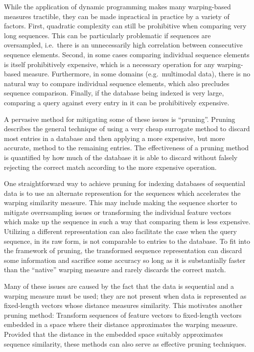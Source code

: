 While the application of dynamic programming makes many warping-based measures tractible, they can be made inpractical in practice by a variety of factors.
First, quadratic complexity can still be prohibitive when comparing very long sequences.
This can be particularly problematic if sequences are oversampled, i.e.\ there is an unnecessarily high correlation between consecutive sequence elements.
Second, in some cases comparing individual sequence elements is itself prohibitively expensive, which is a necessary operation for any warping-based measure.
Furthermore, in some domains (e.g.\ multimodal data), there is no natural way to compare individual sequence elements, which also precludes sequence comparison.
Finally, if the database being indexed is very large, comparing a query against every entry in it can be prohibitively expensive.

A pervasive method for mitigating some of these issues is ``pruning''.
Pruning describes the general technique of using a very cheap surrogate method to discard most entries in a database and then applying a more expensive, but more accurate, method to the remaining entries.
The effectiveness of a pruning method is quantified by how much of the database it is able to discard without falsely rejecting the correct match according to the more expensive operation.

One straightforward way to achieve pruning for indexing databases of sequential data is to use an alternate represention for the sequences which accelerates the warping similarity measure.
This may include making the sequence shorter to mitigate overrsampling issues or transforming the individual feature vectors which make up the sequence in such a way that comparing them is less expensive.
Utilizing a different representation can also facilitate the case when the query sequence, in its raw form, is not comparable to entries to the database.
To fit into the framework of pruning, the transformed sequence representation can discard some information and sacrifice some accuracy so long as it is substantially faster than the ``native'' warping measure and rarely discards the correct match.

Many of these issues are caused by the fact that the data is sequential and a warping measure must be used; they are not present when data is represented as fixed-length vectors whose distance measures similarity.
This motivates another pruning method: Transform sequences of feature vectors to fixed-length vectors embedded in a space where their distance approximates the warping measure.
Provided that the distance in the embedded space suitably approximates sequence similarity, these methods can also serve as effective pruning techniques.

